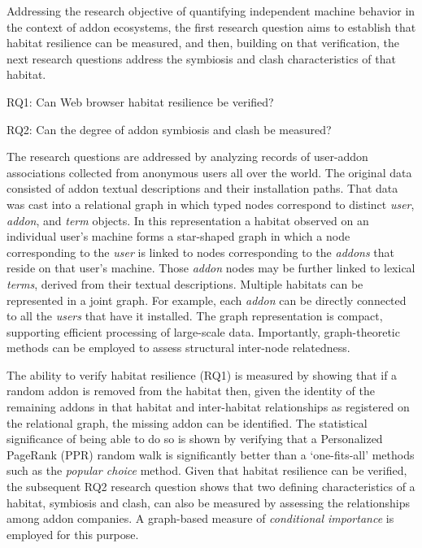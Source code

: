 \documentclass{article} %
\begin{document}
Addressing the research objective of quantifying independent machine behavior in the context of addon ecosystems, the first research question aims to establish that habitat resilience can be measured, and then, building on that verification, the next research questions address the symbiosis and clash characteristics of that habitat. 



\noindent RQ1: Can Web browser habitat resilience be verified?

\noindent RQ2: Can the degree of addon symbiosis and clash be measured? 



The research questions are addressed by analyzing records of user-addon associations collected from anonymous users all over the world. The original data consisted of addon textual descriptions and their installation paths. That data was cast into a relational graph in which typed nodes correspond to distinct \textit{user}, \textit{addon}, and \textit{term} objects. In this representation a habitat observed on an individual user's machine forms a star-shaped graph in which a node corresponding to the \textit{user} is linked to nodes corresponding to the \textit{addons} that reside on that user's machine. Those \textit{addon} nodes may be further linked to lexical\textit{ terms}, derived from their textual descriptions. Multiple habitats can be represented in a joint graph. For example, each \textit{addon} can be directly connected to all the \textit{users} that have it installed. The graph representation is compact, supporting efficient processing of large-scale data. Importantly, graph-theoretic methods can be employed to assess structural inter-node relatedness.

The ability to verify habitat resilience (RQ1) is measured by showing that if a random addon is removed from the habitat then, given the identity of the remaining addons in that habitat and inter-habitat relationships as registered on the relational graph, the missing addon can be identified. The statistical significance of being able to do so is shown by verifying that a Personalized PageRank (PPR) random walk is significantly better than a `one-fits-all' methods such as the \textit{popular choice} method. Given that habitat resilience can be verified, the subsequent RQ2 research question shows that two defining characteristics of a habitat, symbiosis and clash, can also be measured by assessing the relationships among addon companies. A graph-based measure of \textit{conditional importance} is employed for this purpose.
\end{document}
